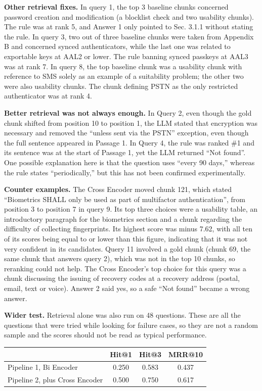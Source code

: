 \documentclass[11pt,a4paper]{article}
\begin{document}
\textbf{Other retrieval fixes.} In query 1, the top 3 baseline chunks concerned password creation and modification (a blocklist check and two usability chunks). The rule was at rank 5, and Answer 1 only pointed to Sec. 3.1.1 without stating the rule. In query 3, two out of three baseline chunks were taken from Appendix B and concerned synced authenticators, while the last one was related to exportable keys at AAL2 or lower. The rule banning synced passkeys at AAL3 was at rank 7. In query 8, the top baseline chunk was a usability chunk with reference to SMS solely as an example of a suitability problem; the other two were also usability chunks. The chunk defining PSTN as the only restricted authenticator was at rank 4.

\textbf{Better retrieval was not always enough.} In Query 2, even though the gold chunk shifted from position 10 to position 1, the LLM stated that encryption was necessary and removed the ``unless sent via the PSTN'' exception, even though the full sentence appeared in Passage 1. In Query 4, the rule was ranked \#1 and its sentence was at the start of Passage 1, yet the LLM returned ``Not found''. One possible explanation here is that the question uses ``every 90 days,'' whereas the rule states ``periodically,'' but this has not been confirmed experimentally.

\textbf{Counter examples.} The Cross Encoder moved chunk 121, which stated ``Biometrics SHALL only be used as part of multifactor authentication'', from position 3 to position 7 in query 9. Its top three choices were a usability table, an introductory paragraph for the biometrics section and a chunk regarding the difficulty of collecting fingerprints. Its highest score was minus 7.62, with all ten of its scores being equal to or lower than this figure, indicating that it was not very confident in its candidates. Query 11 involved a gold chunk (chunk 69, the same chunk that answers query 2), which was not in the top 10 chunks, so reranking could not help. The Cross Encoder's top choice for this query was a chunk discussing the issuing of recovery codes at a recovery address (postal, email, text or voice). Answer 2 said yes, so a safe ``Not found'' became a wrong answer.

\textbf{Wider test.} Retrieval alone was also run on 48 questions. These are all the questions that were tried while looking for failure cases, so they are not a random sample and the scores should not be read as typical performance.

\begin{center}
\small
\begin{tabular}{@{}lccc@{}}
\toprule
 & Hit@1 & Hit@3 & MRR@10 \\
\midrule
Pipeline 1, Bi Encoder & 0.250 & 0.583 & 0.437 \\
Pipeline 2, plus Cross Encoder & 0.500 & 0.750 & 0.617 \\
\bottomrule
\end{tabular}
\end{center}
\end{document}
